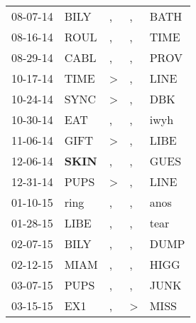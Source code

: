\begin{supertabular}{p{0.07\textwidth}p{0.06\textwidth}p{0.02\textwidth}p{0.02\textwidth}p{0.06\textwidth}}
          08-07-14\textsuperscript{} &           BILY\textsuperscript{} &                , &             , &           BATH\textsuperscript{} \\
          08-16-14\textsuperscript{} &           ROUL\textsuperscript{} &                , &             , &           TIME\textsuperscript{} \\
          08-29-14\textsuperscript{} &           CABL\textsuperscript{} &                , &             , &           PROV\textsuperscript{} \\
          10-17-14\textsuperscript{} &           TIME\textsuperscript{} &     \textgreater &             , &           LINE\textsuperscript{} \\
          10-24-14\textsuperscript{} &           SYNC\textsuperscript{} &     \textgreater &             , &            DBK\textsuperscript{} \\
          10-30-14\textsuperscript{} &            EAT\textsuperscript{} &                , &             , &           iwyh\textsuperscript{} \\
          11-06-14\textsuperscript{} &           GIFT\textsuperscript{} &     \textgreater &             , &           LIBE\textsuperscript{} \\
          12-06-14\textsuperscript{} &  \textbf{SKIN\textsuperscript{}} &                , &             , &           GUES\textsuperscript{} \\
          12-31-14\textsuperscript{} &           PUPS\textsuperscript{} &     \textgreater &             , &           LINE\textsuperscript{} \\
          01-10-15\textsuperscript{} &           ring\textsuperscript{} &                , &             , &           anos\textsuperscript{} \\
          01-28-15\textsuperscript{} &           LIBE\textsuperscript{} &                , &             , &           tear\textsuperscript{} \\
          02-07-15\textsuperscript{} &           BILY\textsuperscript{} &                , &             , &           DUMP\textsuperscript{} \\
          02-12-15\textsuperscript{} &           MIAM\textsuperscript{} &                , &             , &           HIGG\textsuperscript{} \\
          03-07-15\textsuperscript{} &           PUPS\textsuperscript{} &                , &             , &           JUNK\textsuperscript{} \\
          03-15-15\textsuperscript{} &            EX1\textsuperscript{} &                , &  \textgreater &           MISS\textsuperscript{} \\

\end{supertabular}
